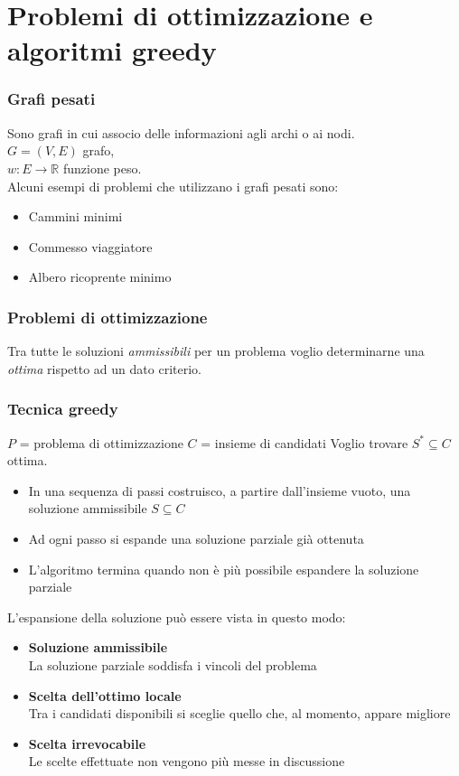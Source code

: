 \section[Ottimizzazione]{Problemi di ottimizzazione e algoritmi greedy}
\subsubsection{Grafi pesati}
Sono grafi in cui associo delle informazioni agli archi o ai nodi.\\
$G = (V, E)$ grafo,\\
$w: E \rightarrow \mathbb{R}$ funzione peso.\\
Alcuni esempi di problemi che utilizzano i grafi pesati sono:
\begin{itemize}
    \item Cammini minimi
    \item Commesso viaggiatore
    \item Albero ricoprente minimo
\end{itemize}

\subsubsection{Problemi di ottimizzazione}
Tra tutte le soluzioni \emph{ammissibili} per un problema voglio determinarne una 
\emph{ottima} rispetto ad un dato criterio.

\subsubsection{Tecnica greedy}
$P$ = problema di ottimizzazione
$C$ = insieme di candidati
Voglio trovare $S^{*} \subseteq C$ ottima.
\begin{itemize}
    \item In una sequenza di passi costruisco, a partire dall'insieme vuoto, una soluzione ammissibile $S \subseteq C$
    \item Ad ogni passo si espande una soluzione parziale già ottenuta
    \item L'algoritmo termina quando non è più possibile espandere la soluzione parziale
\end{itemize}

\noindent L'espansione della soluzione può essere vista in questo modo:
\begin{itemize}
    \item \textbf{Soluzione ammissibile}\\
    La soluzione parziale soddisfa i vincoli del problema
    \item \textbf{Scelta dell'ottimo locale}\\
    Tra i candidati disponibili si sceglie quello che, al momento, appare migliore 
    \item \textbf{Scelta irrevocabile}\\
    Le scelte effettuate non vengono più messe in discussione
\end{itemize}

